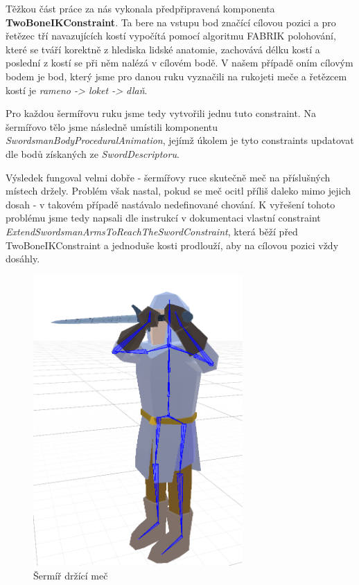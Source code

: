 Těžkou část práce za nás vykonala předpřipravená komponenta \textbf{TwoBoneIKConstraint}. Ta bere na vstupu bod značící cílovou pozici a pro řetězec tří navazujících kostí vypočítá pomocí algoritmu FABRIK \cite{FabrikSolverIK} polohování, které se tváří korektně z hlediska lidské anatomie, zachovává délku kostí a poslední z kostí se při něm nalézá v cílovém bodě. V našem případě oním cílovým bodem je bod, který jsme pro danou ruku vyznačili na rukojeti meče a řetězcem kostí je \textit{rameno -> loket -> dlaň}.

Pro každou šermířovu ruku jsme tedy vytvořili jednu tuto constraint. Na šermířovo tělo jsme následně umístili komponentu \textit{SwordsmanBodyProceduralAnimation}, jejímž úkolem je tyto constraints updatovat dle bodů získaných ze \textit{SwordDescriptoru}. 

Výsledek fungoval velmi dobře - šermířovy ruce skutečně meč na příslušných místech držely. Problém však nastal, pokud se meč ocitl příliš daleko mimo jejich dosah - v takovém případě nastávalo nedefinované chování. K vyřešení tohoto problému jsme tedy napsali dle instrukcí v dokumentaci vlastní constraint \textit{ExtendSwordsmanArmsToReachTheSwordConstraint}, která běží před TwoBoneIKConstraint a jednoduše kosti prodlouží, aby na cílovou pozici vždy dosáhly.


\begin{figure}[ht]\centering
  \center
  \includegraphics[width=80mm]{../img/swordsmanProceduralAnimation.png}
  \caption{Šermíř držící meč}
  \label{obr05:swordsmanProceduralAnimation}
\end{figure} 



